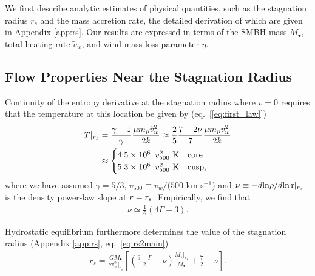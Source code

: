 \documentclass[usenatbib,fleqn]{mn2e}
\newcommand{\rs}{r_s}
\newcommand{\Mstar}{M_{\star}}
\newcommand{\Mbh}[1][]{M_{\bullet#1}}
\newcommand{\densSlope}{\nu}
\begin{document}
We first describe analytic estimates of physical quantities, such as the stagnation radius $\rs$ and the mass accretion rate, the detailed derivation of which are given in Appendix \ref{app:rs}.  Our results are expressed in terms of the SMBH mass $M_{\bullet}$, total heating rate $\tilde{v}_{w}$, and wind mass loss parameter $\eta$.

\subsection{Flow Properties Near the Stagnation Radius}

Continuity of the entropy derivative at the stagnation radius where $v = 0$ requires that the temperature at this location be given by (eq.~[\ref{eq:first_law}])
\begin{align}
T|_{r_{s}}& = \frac{\gamma-1}{\gamma}\frac{\mu m_p
  \tilde{v}_{w}^{2}}{2k} \approx \frac{2}{5} \frac{7-2\nu}{7} \frac{\mu m_p
   v_{w}^{2}}{2k}\nonumber\\ 
 &\approx
 \begin{cases}
  4.5\times 10^6\ \, v_{500}^2 \,\,{\rm K} & \text{core} \\
  5.3\times 10^6\ \, v_{500}^2 \,\,{\rm K} & \text{cusp},
 \end{cases}
\label{eq:Tanalytic}
\end{align}
where we have assumed $\gamma=5/3$, $v_{500} \equiv v_{w}/(500$ km
s$^{-1}$) and $\densSlope \equiv -d{\rm ln}\rho/d{\rm ln\,r}|_{r_{\rm
    s}}$ is the density power-law slope at $r = r_{\rm s}$.
Empirically, we find that
\begin{align}
\densSlope \simeq \frac{1}{6} \left(4 \Gamma+3\right).
\label{eq:densSlope}
\end{align}

Hydrostatic equilibrium furthermore determines the value of the stagnation radius (Appendix \ref{app:rs}, eq.~\ref{eq:rs2main})
\begin{align}
  \rs=\frac{G \Mbh}{\densSlope
    v_w^{2}|_{\rs}}\left[\left(\frac{9-\Gamma}{2} -\densSlope\right)
    \frac{\Mstar|_{\rs}}{\Mbh} +\frac{7}{2}-\densSlope\right].
\label{eq:stag_analytic}
\end{align}
\end{document}
